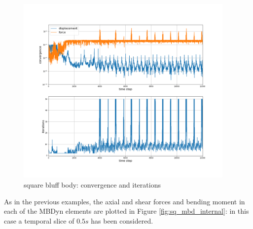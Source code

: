 \begin{figure}[htbp!]
	\centering
	\includegraphics[width=0.95\textwidth, trim=0 80 0 100, clip]{images/sq-cyl/MBD_iterations_sq.png}
	\caption{square bluff body: convergence and iterations}
	\label{fig:sq_mbd_iter}
\end{figure}

As in the previous examples, the axial and shear forces and bending moment in each of the MBDyn elements are plotted in Figure \ref{fig:sq_mbd_internal}: in this case a temporal slice of $0.5s$ has been considered.

